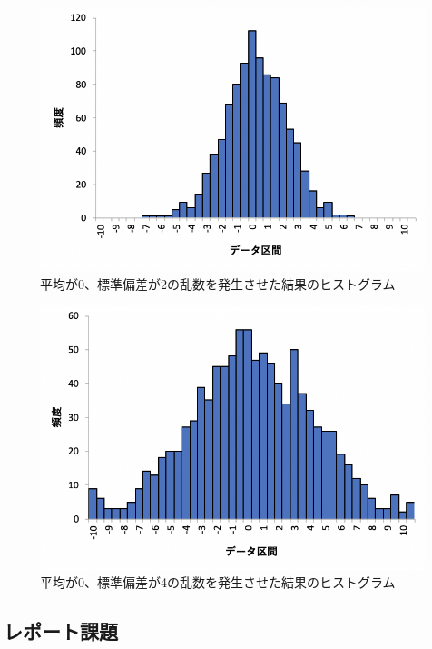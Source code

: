 \documentclass[12pt]{jarticle}
\begin{document}
\begin{figure}[h]
    \begin{center}
        \includegraphics[scale=0.7]{kadai4_3graph4.png}
    \end{center}
    \caption{平均が0、標準偏差が2の乱数を発生させた結果のヒストグラム}
\end{figure}
\begin{figure}[h]
    \begin{center}
        \includegraphics[scale=0.7]{kadai4_3graph5.png}
    \end{center}
    \caption{平均が0、標準偏差が4の乱数を発生させた結果のヒストグラム}
\end{figure}
\clearpage

\subsection{レポート課題}
\end{document}
